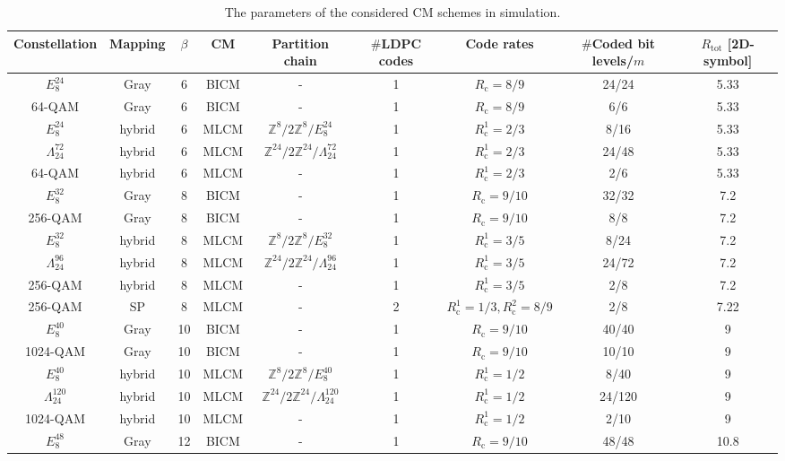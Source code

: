 \documentclass[journal]{IEEEtran}
\newcommand{\Z}{\mathbb{Z}}
\newcommand{\Rc}{R_\mathrm{c}}
\begin{document}
\begin{table}[tbp]
  \renewcommand{\arraystretch}{1.3}
  \renewcommand{\tabcolsep}{1.2pt}
  \caption{The parameters of the considered CM schemes in simulation.}
  \label{tab:CMparameters}
  \centering
  \begin{tabular}{c c c c c c c c c}
    \hline 
    Constellation & Mapping & $\beta$ & CM & Partition chain&$\#$LDPC codes & Code rates & $\#$Coded bit levels/$m$ & $R_{\text{tot}}$ [2D-symbol] \\
    \hline \hline 
    $E_8^{24}$ & Gray & 6& BICM& -& 1 &$\Rc=8/9$ &24/24 & 5.33\\
    64-QAM & Gray & 6& BICM &-& 1 &$\Rc=8/9$ &6/6 & 5.33\\
    $E_8^{24}$ & hybrid & 6& MLCM &$\Z^{8}/2\Z^{8}/E_{8}^{24}$& 1 &$\Rc^1=2/3$ &8/16 & 5.33\\
    $\Lambda_{24}^{72}$ & hybrid & 6& MLCM &$\Z^{24}/2\Z^{24}/\Lambda_{24}^{72}$& 1 &$\Rc^1=2/3$ &24/48 & 5.33\\
    64-QAM & hybrid & 6& MLCM &-& 1 &$\Rc^1=2/3$ &2/6 & 5.33\\
    \hline
    $E_8^{32}$ & Gray & 8& BICM& -& 1 &$\Rc=9/10$ &32/32 & 7.2\\
    256-QAM & Gray & 8& BICM &-& 1 &$\Rc=9/10$ &8/8 & 7.2\\
    $E_8^{32}$ & hybrid & 8& MLCM &$\Z^8/2\Z^8/E_8^{32}$& 1 &$\Rc^1=3/5$ &8/24 & 7.2\\
    $\Lambda_{24}^{96}$ & hybrid & 8& MLCM &$\Z^{24}/2\Z^{24}/\Lambda_{24}^{96}$& 1 &$\Rc^1=3/5$ &24/72 & 7.2\\
    256-QAM & hybrid & 8& MLCM &-& 1 &$\Rc^1=3/5$ &2/8 & 7.2\\
    256-QAM & SP & 8& MLCM &-& 2 &$\Rc^1=1/3, \Rc^2=8/9$ &2/8 & 7.22\\
    \hline
    $E_8^{40}$ & Gray & 10& BICM& -& 1 &$\Rc=9/10$ &40/40 & 9\\
    1024-QAM & Gray & 10& BICM &-& 1 &$\Rc=9/10$ &10/10 & 9\\
    $E_8^{40}$ & hybrid & 10& MLCM &$\Z^8/2\Z^8/E_8^{40}$& 1 &$\Rc^1=1/2$ &8/40 & 9\\
    $\Lambda_{24}^{120}$ & hybrid & 10& MLCM &$\Z^{24}/2\Z^{24}/\Lambda_{24}^{120}$& 1 &$\Rc^1=1/2$ &24/120 & 9\\
    1024-QAM & hybrid & 10& MLCM &-& 1 &$\Rc^1=1/2$ &2/10 & 9\\
    \hline
    $E_8^{48}$ & Gray & 12& BICM& -& 1 &$\Rc=9/10$ &48/48 & 10.8\\

\end{tabular}
\end{table}
\end{document}
